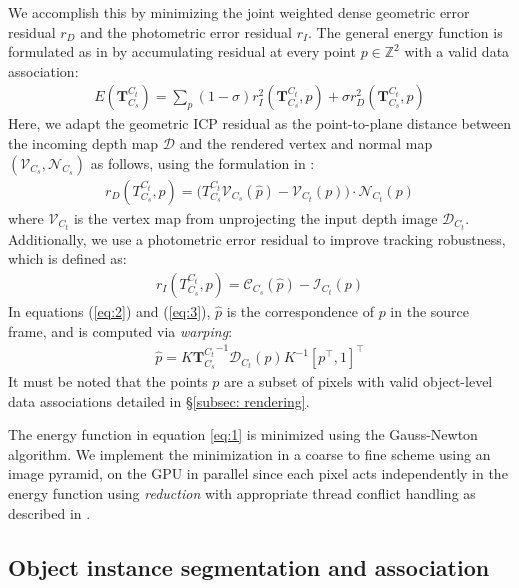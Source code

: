 We accomplish this by minimizing the joint weighted dense geometric error residual $r_D$ and the photometric error residual $r_I$. The general energy function is formulated as in \cite{parkColoredPointCloud2017} by accumulating residual at every point $p \in \mathbb{Z}^2$ with a valid data association:
\begin{align}
    E(\mathbf{T}^{C_t}_{C_{s}}) = \sum_{p} (1 - \sigma) r_I^2(\mathbf{T}^{C_t}_{C_s}, p) + \sigma r_D^2(\mathbf{T}^{C_t}_{C_s}, p) \label{eq:1}
\end{align}
Here, we adapt the geometric ICP residual as the point-to-plane distance between the incoming depth map $\mathcal{D}$ and the rendered vertex and normal map $(\mathcal{V}_{C_s}, \mathcal{N}_{C_s})$ as follows, using the formulation in \cite{newcombeKinectFusionRealtimeDense2011}:
\begin{align}
    r_D(T^{C_t}_{C_s}, p) = \bigg(T^{C_t}_{C_{s}} \mathcal{V}_{C_s}( \hat{p} ) - \mathcal{V}_{C_{t}}(p )\bigg) \cdot \mathcal{N}_{C_{t}}( p ) \label{eq:2}
\end{align}
where $\mathcal{V}_{C_t}$ is the vertex map from unprojecting the input depth image $\mathcal{D}_{C_t}$.
Additionally, we use a photometric error residual to improve tracking robustness, which is defined as:
\begin{align}
    r_I(T^{C_t}_{C_s}, p) = \mathcal{C}_{C_s}(\hat{p}) - \mathcal{I}_{C_t}(p) \label{eq:3}
\end{align}
In equations (\ref{eq:2}) and (\ref{eq:3}), $\hat{p}$ is the correspondence of $p$ in the source frame, and is computed via \textit{warping}:
\begin{align}
    \hat{p} = K {\mathbf{T}^{C_t}_{C_s}}^{-1}\mathcal{D}_{C_t}(p)K^{-1}[p^\top, 1]^\top \label{eq:4}
\end{align}
It must be noted that the points $p$ are a subset of pixels with valid object-level data associations detailed in \S\ref{subsec: rendering}.

The energy function in equation \ref{eq:1} is minimized using the Gauss-Newton algorithm. We implement the minimization in a coarse to fine scheme using an image pyramid, on the GPU in parallel since each pixel acts independently in the energy function using \textit{reduction} with appropriate thread conflict handling as described in \cite{dongGPUAcceleratedRobust2019}.

\subsection{Object instance segmentation and association} \label{subsec: segmentation}

